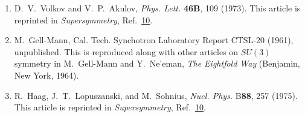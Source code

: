 \begin{enumerate}
  \item {}\label{ch24-ref-13}
  D.~V.~Volkov and V.~P.~Akulov, \textit{Phys. Lett.} \textbf{46B}, 109
  (1973). This article is reprinted in \textit{Supersymmetry},
  Ref.~\hyperref[ch24-ref-10]{10}.

  \item {}\label{ch24-ref-14}
  M.~Gell-Mann, Cal. Tech. Synchotron Laboratory Report CTSL-20 (1961),
  unpublished. This is reproduced along with other articles on $SU(3)$
  symmetry in M.~Gell-Mann and Y.~Ne'eman, \textit{The Eightfold Way}
  (Benjamin, New York, 1964).

  \item {}\label{ch24-ref-15}
  R.~Haag, J.~T.~Lopuszanski, and M.~Sohnius, \textit{Nucl. Phys.}
  B\textbf{88}, 257 (1975). This article is reprinted in
  \textit{Supersymmetry}, Ref.~\hyperref[ch24-ref-10]{10}.
\end{enumerate}
